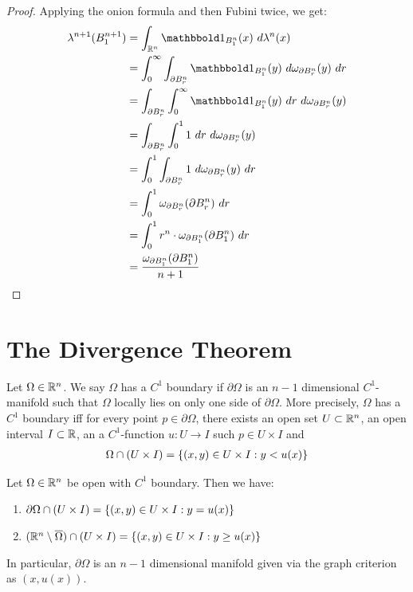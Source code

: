 \begin{proof}
	Applying the onion formula and then Fubini twice, we get:
	\begin{align*}
		\lambda^{n+1}(B_1^{n+1}) 
		&= \int_{\bR^n} \boldone_{B_1^n}(x) ~d\lambda^n(x)\\
		&= \int_{0}^\infty \int_{\partial{B_r^n}} \boldone_{B_1^n}(y) ~d\omega_{\partial B_r^n}(y) ~dr\\
		&= \int_{\partial{B_r^n}} \int_{0}^\infty  \boldone_{B_1^n}(y)  ~dr ~d\omega_{\partial B_r^n}(y)\\
		&= \int_{\partial{B_r^n}} \int_{0}^1  1  ~dr ~d\omega_{\partial B_r^n}(y)\\
		&= \int_{0}^1  \int_{\partial{B_r^n}} 1  ~d\omega_{\partial B_r^n}(y) ~dr\\
		&= \int_0^1 \omega_{\partial B_r^n}(\partial B_r^n) ~dr\\
		&= \int_0^1 r^n \cdot \omega_{\partial B_1^n}(\partial B_1^n) ~dr\\
		&= \frac{\omega_{\partial B_1^n}(\partial B_1^n)}{n+1}
	\end{align*}
\end{proof}
\clearpage

\section{The Divergence Theorem}
\begin{definition}
	Let $\Omega \in \mathbb{R}^n$. We say $\Omega$ has a $C^1$ boundary if $\partial\Omega$ is an $n-1$ dimensional $C^1$-manifold such that $\Omega$ locally lies on only one side of $\partial \Omega$.
	\newpar
	More precisely, $\Omega$ has a $C^1$ boundary iff for every point $p \in \partial \Omega$, there exists an open set $U \subset \mathbb{R}^n$, an open interval $I \subset \mathbb{R}$, an a $C^1$-function $u : U \to I$ such $p \in U \times I$ and
	\begin{align*}
		\Omega \cap (U \times I) = \qty{(x,y) \in U \times I : y < u(x)}
	\end{align*}	
\end{definition}
\begin{lemma}
	Let $\Omega \in \mathbb{R}^n$ be open with $C^1$ boundary. Then we have:
	\begin{enumerate}
		\item $\partial \Omega \cap (U \times I) = \qty{(x,y) \in U \times I : y = u(x)}$
		\item $(\mathbb{R}^n \setminus \overline{{\Omega}}) \cap (U \times I) = \qty{(x,y) \in U \times I : y \geq u(x)}$
	\end{enumerate}
	In particular, $\partial \Omega$ is an $n-1$ dimensional manifold given via the graph criterion as $(x,u(x))$.
\end{lemma}

